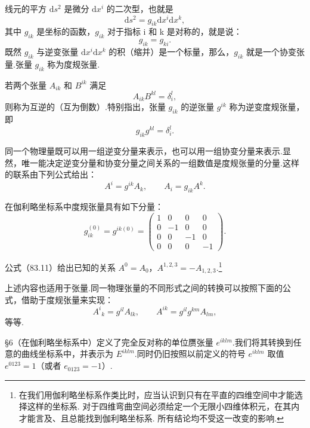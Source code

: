 线元的平方 $\mathrm{d}s^2$ 是微分 $\mathrm{d}x^i$ 的二次型，也就是
\begin{equation}
  \mathrm{d}s^2=g_{ik}\mathrm{d}x^i\mathrm{d}x^k,
\end{equation}
其中 $g_{ik}$ 是坐标的函数，$g_{ik}$ 对于指标 i 和 k 是对称的，就是说：
\begin{equation}
  g_{ik}=g_{ki}.
\end{equation}
既然 $g_{ik}$ 与逆变张量 $\mathrm{d}x^i\mathrm{d}x^k$ 的积（缩并）是一个标量，那么，$g_{ik}$ 就是一个协变张量.张量 $g_{ik}$ 称为度规张量.

若两个张量 $A_{ik}$ 和 $B^{ik}$ 满足
\begin{equation*}
  A_{ik}B^{kl}=\delta^l_i,
\end{equation*}
则称为互逆的（互为倒数）.特别指出，张量 $g_{ik}$ 的逆张量 $g^{ik}$ 称为逆变度规张量，即
\begin{equation}
  g_{ik}g^{kl}=\delta^l_i.
\end{equation}

同一个物理量既可以用一组逆变分量来表示，也可以用一组协变分量来表示.显然，唯一能决定逆变分量和协变分量之间关系的一组数值是度规张量的分量.这样的联系由下列公式给出：
\begin{equation}
  A^i=g^{ik}A_k,\qquad A_i=g_{ik}A^k.
\end{equation}

在伽利略坐标系中度规张量具有如下分量：
\begin{equation}
  g^{(0)}_{ik}=g^{ik(0)}=
  \begin{pmatrix}
    1 & 0 & 0 & 0\\
    0 & -1 & 0 & 0\\
    0 & 0 & -1 & 0\\
    0 & 0 & 0 & -1
  \end{pmatrix}.
\end{equation}

公式（83.11）给出已知的关系 $A^0=A_0$，$A^{1,2,3}=-A_{1,2,3}$.\footnote{在我们用伽利略坐标系作类比时，应当认识到只有在平直的四维空间中才能选择这样的坐标系. 对于四维弯曲空间必须给定一个无限小四维体积元，在其内才能言及、且总能找到伽利略坐标系. 所有结论均不受这一改变的影响.}

上述内容也适用于张量.同一物理张量的不同形式之间的转换可以按照下面的公式，借助于度规张量来实现：
\begin{equation*}
  A^i{}_k=g^{il}A_{lk},\qquad
  A^{ik}=g^{il}g^{km}A_{lm},
\end{equation*}
等等.

§6（在伽利略坐标系中）定义了完全反对称的单位赝张量 $e^{iklm}$.我们将其转换到任意的曲线坐标系中，并表示为 $E^{iklm}$.同时仍旧按照以前定义的符号 $e^{iklm}$ 取值 $e^{0123}=1$（或者 $e_{0123}=-1$）.

